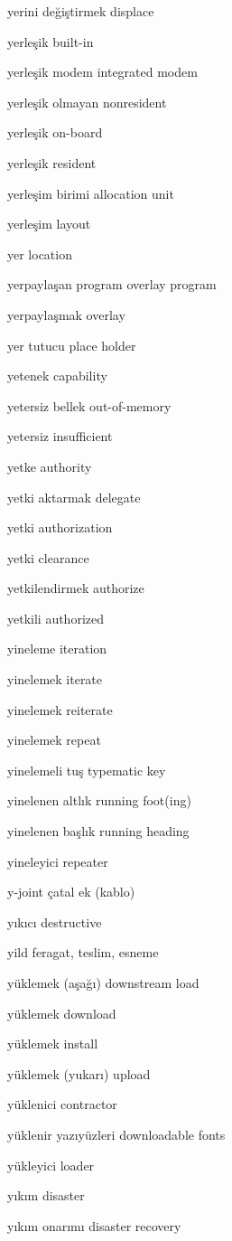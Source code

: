 \documentclass[12pt,fleqn]{article}\usepackage{../../common}
\begin{document}
yerini değiştirmek displace

yerleşik built-in

yerleşik modem integrated modem

yerleşik olmayan nonresident

yerleşik on-board

yerleşik resident

yerleşim birimi allocation unit

yerleşim layout

yer location

yerpaylaşan program overlay program

yerpaylaşmak overlay

yer tutucu place holder

yetenek capability

yetersiz bellek out-of-memory

yetersiz insufficient

yetke authority

yetki aktarmak delegate

yetki authorization

yetki clearance

yetkilendirmek authorize

yetkili authorized

yineleme iteration

yinelemek iterate

yinelemek reiterate

yinelemek repeat

yinelemeli tuş typematic key

yinelenen altlık running foot(ing)

yinelenen başlık running heading

yineleyici repeater

y-joint çatal ek (kablo)

yıkıcı destructive

yild feragat, teslim, esneme 

yüklemek (aşağı) downstream load

yüklemek download

yüklemek install

yüklemek (yukarı) upload

yüklenici contractor

yüklenir yazıyüzleri downloadable fonts

yükleyici loader

yıkım disaster

yıkım onarımı disaster recovery
\end{document}
